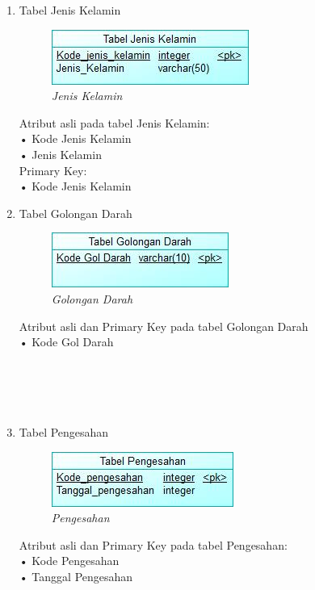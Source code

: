 \documentclass[12pt,a4paper,bahasa]{article}
\begin{document}
\begin{enumerate}
\item Tabel Jenis Kelamin\\
\begin{figure}[!htbp]
\centering
\includegraphics[scale=1.0]{gambar/JenisKelamin.jpeg}
\caption{\textit{Jenis Kelamin}}
\label{Jenis Kelamin}
\end{figure}
Atribut asli pada tabel Jenis Kelamin:\\
•	Kode Jenis Kelamin\\
•	Jenis Kelamin\\
Primary Key:\\
•	Kode Jenis Kelamin

\item Tabel Golongan Darah\\
\begin{figure}[!htbp]
\centering
\includegraphics[scale=1.0]{gambar/Goldar.jpeg}
\caption{\textit{Golongan Darah}}
\label{Golongan Darah}
\end{figure}
Atribut asli dan Primary Key pada tabel Golongan Darah\\
•	Kode Gol Darah
\\
\\
\\
\\
\\
\item Tabel Pengesahan\\
\begin{figure}[!htbp]
\centering
\includegraphics[scale=1.0]{gambar/Pengesahan.jpeg}
\caption{\textit{Pengesahan}}
\label{Pengesahan}
\end{figure}
Atribut asli dan Primary Key pada tabel Pengesahan:\\
•	Kode Pengesahan\\
•	Tanggal Pengesahan


\end{enumerate}
\end{document}
